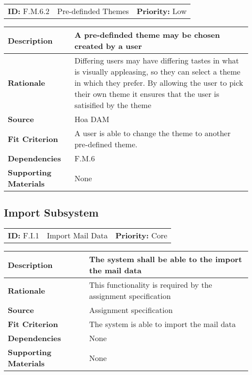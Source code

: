 \begin{table}[H]
    \begin{tabularx}{\textwidth}{| l | X | l |}
        \hline
        \textbf{ID:} F.M.6.2 & Pre-definded Themes & \textbf{Priority:} Low \\
    \end{tabularx}
    \begin{tabularx}{\textwidth}{| l | X |}
        \hline
        \textbf{Description} & A pre-definded theme may be chosen created by a user\\ \hline
        \textbf{Rationale} & Differing users may have differing tastes in what is visually appleasing, so they can select a theme in which they prefer. By allowing the user to pick their own theme it ensures that the user is satisified by the theme\\ \hline
        \textbf{Source} & Hoa DAM\\ \hline
        \textbf{Fit Criterion} & A user is able to change the theme to another pre-defined theme.\\ \hline
        \textbf{Dependencies} & F.M.6 \\ \hline
        \textbf{Supporting Materials} & None \\ \hline
    \end{tabularx}
\end{table}


\subsection{Import Subsystem}

\begin{table}[H]
    \begin{tabularx}{\textwidth}{| l | X | l |}
        \hline
        \textbf{ID:} F.I.1 & Import Mail Data & \textbf{Priority:} Core \\
    \end{tabularx}
    \begin{tabularx}{\textwidth}{| l | X |}
        \hline
        \textbf{Description} & The system shall be able to the import the mail data \\ \hline
        \textbf{Rationale} & This functionality is required by the assignment specification\\ \hline
        \textbf{Source} & Assignment specification\\ \hline
        \textbf{Fit Criterion} & The system is able to import the mail data\\ \hline
        \textbf{Dependencies} & None \\ \hline
        \textbf{Supporting Materials} & None \\ \hline
    \end{tabularx}
\end{table}

